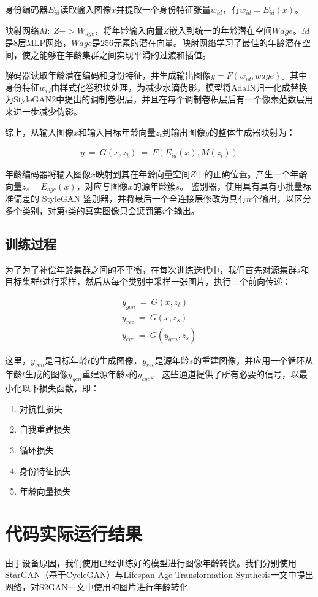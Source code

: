 \documentclass[12pt,a4paper]{article}
\begin{document}
身份编码器$E_{id}$读取输入图像$x$并提取一个身份特征张量$w_{id}$，有$w_{id}=E_{id}(x)$。


映射网络$M:\ Z->W_{age}$，将年龄输入向量$Z$嵌入到统一的年龄潜在空间$Wage$。$M$是$8$层MLP网络，$Wage$是$256$元素的潜在向量。映射网络学习了最佳的年龄潜在空间，使之能够在年龄集群之间实现平滑的过渡和插值。


解码器读取年龄潜在编码和身份特征，并生成输出图像$y=F(w_{id},wage)$。其中身份特征$w_{id}$由样式化卷积块处理，为减少水滴伪影，模型将AdaIN归一化成替换为StyleGAN2中提出的调制卷积层，并且在每个调制卷积层后有一个像素范数层用来进一步减少伪影。


综上，从输入图像$x$和输入目标年龄向量$z_t$到输出图像$y$的整体生成器映射为：

\begin{align*}
	y\ =\ G(x,z_t)\ =\ F(E_{id}(x),M(z_t))
\end{align*}

年龄编码器将输入图像$x$映射到其在年龄向量空间$Z$中的正确位置。产生一个年龄向量$z_s=E_{age}(x)$，对应与图像$x$的源年龄簇$s$。
鉴别器，使用具有具有小批量标准偏差的 StyleGAN 鉴别器，并将最后一个全连接层修改为具有$n$个输出，以区分多个类别，对第$i$类的真实图像只会惩罚第$i$个输出。

\subsection{训练过程}
为了为了补偿年龄集群之间的不平衡，在每次训练迭代中，我们首先对源集群$s$和目标集群$t$进行采样，然后从每个类别中采样一张图片，执行三个前向传递：

\begin{align*}
	y_{gen}\ =\ G(x,z_t) \\
	y_{rec}\ =\ G(x,z_s) \\
	y_{cyc}\ =\ G(y_{gen},z_s)
\end{align*}

这里，$y_{gen}$是目标年龄$t$的生成图像，$y_{rec}$是源年龄$s$的重建图像，并应用一个循环从年龄$t$生成的图像$y_{gen}$重建源年龄$s$的$y_{cyc}$。 这些通道提供了所有必要的信号，以最小化以下损失函数，即：
\begin{enumerate}
	\item 对抗性损失
	\item 自我重建损失
	\item 循环损失
	\item 身份特征损失
	\item 年龄向量损失
\end{enumerate}

\section{代码实际运行结果}
由于设备原因，我们使用已经训练好的模型进行图像年龄转换。我们分别使用StarGAN（基于CycleGAN）与Lifespan Age Transformation Synthesis一文中提出网络，对S2GAN一文中使用的图片进行年龄转化.
\end{document}

